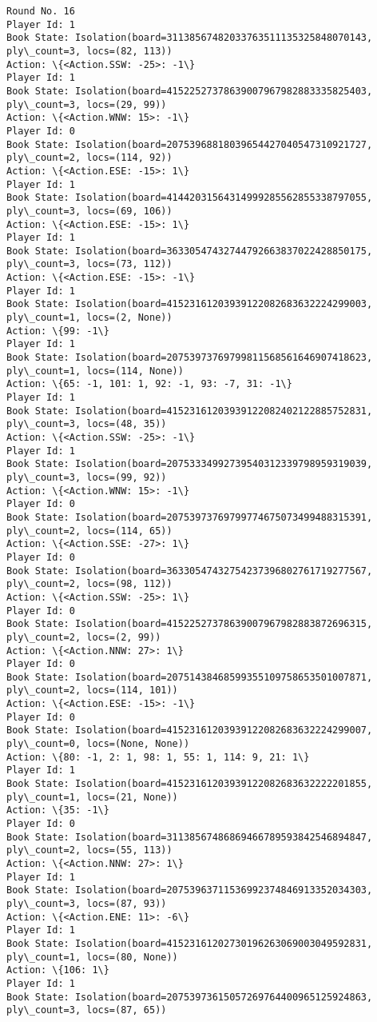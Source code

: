 \documentclass[11pt]{article}
\begin{document}
\begin{Verbatim}[commandchars=\\\{\}]
Round No. 16
Player Id: 1
Book State: Isolation(board=31138567482033763511135325848070143, ply\_count=3, locs=(82, 113))
Action: \{<Action.SSW: -25>: -1\}
Player Id: 1
Book State: Isolation(board=41522527378639007967982883335825403, ply\_count=3, locs=(29, 99))
Action: \{<Action.WNW: 15>: -1\}
Player Id: 0
Book State: Isolation(board=20753968818039654427040547310921727, ply\_count=2, locs=(114, 92))
Action: \{<Action.ESE: -15>: 1\}
Player Id: 1
Book State: Isolation(board=41442031564314999285562855338797055, ply\_count=3, locs=(69, 106))
Action: \{<Action.ESE: -15>: 1\}
Player Id: 1
Book State: Isolation(board=36330547432744792663837022428850175, ply\_count=3, locs=(73, 112))
Action: \{<Action.ESE: -15>: -1\}
Player Id: 1
Book State: Isolation(board=41523161203939122082683632224299003, ply\_count=1, locs=(2, None))
Action: \{99: -1\}
Player Id: 1
Book State: Isolation(board=20753973769799811568561646907418623, ply\_count=1, locs=(114, None))
Action: \{65: -1, 101: 1, 92: -1, 93: -7, 31: -1\}
Player Id: 1
Book State: Isolation(board=41523161203939122082402122885752831, ply\_count=3, locs=(48, 35))
Action: \{<Action.SSW: -25>: -1\}
Player Id: 1
Book State: Isolation(board=20753334992739540312339798959319039, ply\_count=3, locs=(99, 92))
Action: \{<Action.WNW: 15>: -1\}
Player Id: 0
Book State: Isolation(board=20753973769799774675073499488315391, ply\_count=2, locs=(114, 65))
Action: \{<Action.SSE: -27>: 1\}
Player Id: 0
Book State: Isolation(board=36330547432754237396802761719277567, ply\_count=2, locs=(98, 112))
Action: \{<Action.SSW: -25>: 1\}
Player Id: 0
Book State: Isolation(board=41522527378639007967982883872696315, ply\_count=2, locs=(2, 99))
Action: \{<Action.NNW: 27>: 1\}
Player Id: 0
Book State: Isolation(board=20751438468599355109758653501007871, ply\_count=2, locs=(114, 101))
Action: \{<Action.ESE: -15>: -1\}
Player Id: 0
Book State: Isolation(board=41523161203939122082683632224299007, ply\_count=0, locs=(None, None))
Action: \{80: -1, 2: 1, 98: 1, 55: 1, 114: 9, 21: 1\}
Player Id: 1
Book State: Isolation(board=41523161203939122082683632222201855, ply\_count=1, locs=(21, None))
Action: \{35: -1\}
Player Id: 0
Book State: Isolation(board=31138567486869466789593842546894847, ply\_count=2, locs=(55, 113))
Action: \{<Action.NNW: 27>: 1\}
Player Id: 1
Book State: Isolation(board=20753963711536992374846913352034303, ply\_count=3, locs=(87, 93))
Action: \{<Action.ENE: 11>: -6\}
Player Id: 1
Book State: Isolation(board=41523161202730196263069003049592831, ply\_count=1, locs=(80, None))
Action: \{106: 1\}
Player Id: 1
Book State: Isolation(board=20753973615057269764400965125924863, ply\_count=3, locs=(87, 65))

\end{Verbatim}
\end{document}
